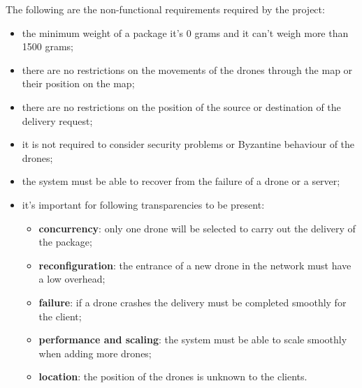 \documentclass[a4paper, oneside]{memoir}
\begin{document}
The following are the non-functional requirements required by the project:
\begin{itemize}
\item the minimum weight of a package it's 0 grams and it can't weigh more than 1500 grams;
\item there are no restrictions on the movements of the drones through the map or their position on the map;
\item there are no restrictions on the position of the source or destination of the delivery request;
\item it is not required to consider security problems or Byzantine behaviour of the drones;
\item the system must be able to recover from the failure of a drone or a server;
\item it's important for following transparencies to be present:
	\begin{itemize}
	\item \textbf{concurrency}: only one drone will be selected to carry out the delivery of the package;
	\item \textbf{reconfiguration}: the entrance of a new drone in the network must have a low overhead;
	\item \textbf{failure}: if a drone crashes the delivery must be completed smoothly for the client;
	\item \textbf{performance and scaling}: the system must be able to scale smoothly when adding more drones;
	\item \textbf{location}: the position of the drones is unknown to the clients.
	\end{itemize}
\end{itemize}
\end{document}

